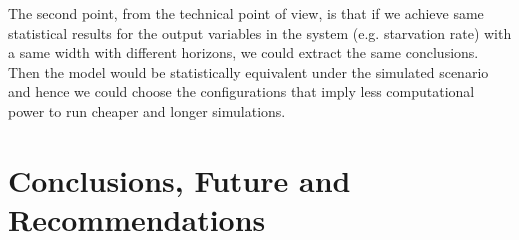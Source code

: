 \documentclass[11pt,oneside,a4paper,openright]{report}
\begin{document}
The second point, from the technical point of view, is that if we achieve same statistical results for the output variables in the system (e.g. starvation rate) with a same width with different horizons, we could extract the same conclusions. Then the model would be statistically equivalent under the simulated scenario and hence we could choose the configurations that imply less computational power to run cheaper and longer simulations.



	




\chapter{Conclusions, Future and Recommendations}








%
  
\end{document}
